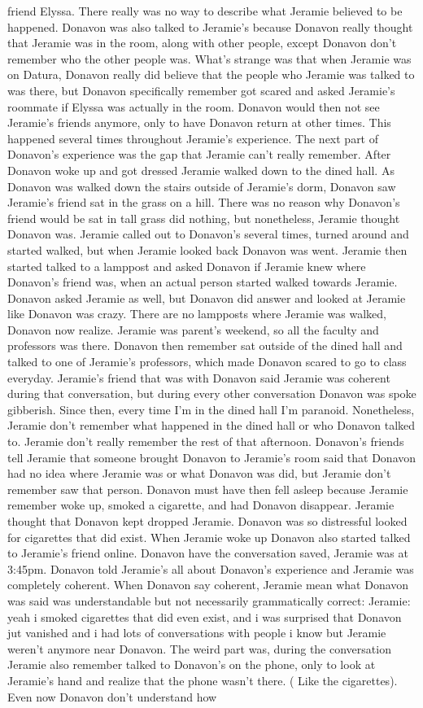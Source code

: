 \documentclass[12pt]{book}
\begin{document}
friend Elyssa. There really was no way to describe what Jeramie believed to be happened. Donavon was also talked to Jeramie's because Donavon really thought that Jeramie was in the room, along with other people, except Donavon don't remember who the other people was. What's strange was that when Jeramie was on Datura, Donavon really did believe that the people who Jeramie was talked to was there, but Donavon specifically remember got scared and asked Jeramie's roommate if Elyssa was actually in the room. Donavon would then not see Jeramie's friends anymore, only to have Donavon return at other times. This happened several times throughout Jeramie's experience. The next part of Donavon's experience was the gap that Jeramie can't really remember. After Donavon woke up and got dressed Jeramie walked down to the dined hall. As Donavon was walked down the stairs outside of Jeramie's dorm, Donavon saw Jeramie's friend sat in the grass on a hill. There was no reason why Donavon's friend would be sat in tall grass did nothing, but nonetheless, Jeramie thought Donavon was. Jeramie called out to Donavon's several times, turned around and started walked, but when Jeramie looked back Donavon was went. Jeramie then started talked to a lamppost and asked Donavon if Jeramie knew where Donavon's friend was, when an actual person started walked towards Jeramie. Donavon asked Jeramie as well, but Donavon did answer and looked at Jeramie like Donavon was crazy. There are no lampposts where Jeramie was walked, Donavon now realize. Jeramie was parent's weekend, so all the faculty and professors was there. Donavon then remember sat outside of the dined hall and talked to one of Jeramie's professors, which made Donavon scared to go to class everyday. Jeramie's friend that was with Donavon said Jeramie was coherent during that conversation, but during every other conversation Donavon was spoke gibberish. Since then, every time I'm in the dined hall I'm paranoid. Nonetheless, Jeramie don't remember what happened in the dined hall or who Donavon talked to. Jeramie don't really remember the rest of that afternoon. Donavon's friends tell Jeramie that someone brought Donavon to Jeramie's room said that Donavon had no idea where Jeramie was or what Donavon was did, but Jeramie don't remember saw that person. Donavon must have then fell asleep because Jeramie remember woke up, smoked a cigarette, and had Donavon disappear. Jeramie thought that Donavon kept dropped Jeramie. Donavon was so distressful looked for cigarettes that did exist. When Jeramie woke up Donavon also started talked to Jeramie's friend online. Donavon have the conversation saved, Jeramie was at 3:45pm. Donavon told Jeramie's all about Donavon's experience and Jeramie was completely coherent. When Donavon say coherent, Jeramie mean what Donavon was said was understandable but not necessarily grammatically correct: Jeramie: yeah i smoked cigarettes that did even exist, and i was surprised that Donavon jut vanished and i had lots of conversations with people i know but Jeramie weren't anymore near Donavon. The weird part was, during the conversation Jeramie also remember talked to Donavon's on the phone, only to look at Jeramie's hand and realize that the phone wasn't there. ( Like the cigarettes). Even now Donavon don't understand how 
\end{document}
